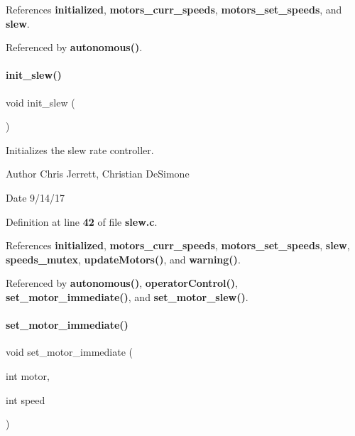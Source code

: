 References \textbf{ initialized}, \textbf{ motors\+\_\+curr\+\_\+speeds}, \textbf{ motors\+\_\+set\+\_\+speeds}, and \textbf{ slew}.



Referenced by \textbf{ autonomous()}.

\mbox{\label{slew_8h_a321758941d88b75783955c819bb75005}} 
\paragraph{init\+\_\+slew()}
{\footnotesize\ttfamily void init\+\_\+slew (\begin{DoxyParamCaption}{ }\end{DoxyParamCaption})}



Initializes the slew rate controller. 

\begin{DoxyAuthor}{Author}
Chris Jerrett, Christian De\+Simone 
\end{DoxyAuthor}
\begin{DoxyDate}{Date}
9/14/17 
\end{DoxyDate}


Definition at line \textbf{ 42} of file \textbf{ slew.\+c}.



References \textbf{ initialized}, \textbf{ motors\+\_\+curr\+\_\+speeds}, \textbf{ motors\+\_\+set\+\_\+speeds}, \textbf{ slew}, \textbf{ speeds\+\_\+mutex}, \textbf{ update\+Motors()}, and \textbf{ warning()}.



Referenced by \textbf{ autonomous()}, \textbf{ operator\+Control()}, \textbf{ set\+\_\+motor\+\_\+immediate()}, and \textbf{ set\+\_\+motor\+\_\+slew()}.

\mbox{\label{slew_8h_a9f8b8ae577ef938622024545711f0151}} 
\paragraph{set\+\_\+motor\+\_\+immediate()}
{\footnotesize\ttfamily void set\+\_\+motor\+\_\+immediate (\begin{DoxyParamCaption}\item[{int}]{motor,  }\item[{int}]{speed }\end{DoxyParamCaption})}



